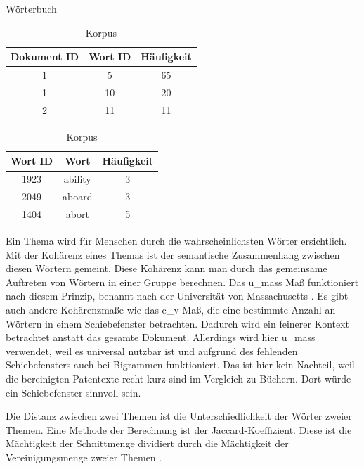 \begin{table}[!htb]
	\RawFloats
	\begin{minipage}{.5\linewidth}
		\caption{Wörterbuch}
		\centering
		\label{table:words}
		\begin{tabular}{|c|c|c|}
			\hline 
			Dokument ID & Wort ID & Häufigkeit \\ 
			\hline 
			1& 5 &65  \\ 
			\hline 
			1& 10 & 20 \\ 
			\hline 
			2& 11 & 11 \\ 
			\hline 
		\end{tabular} 
	\end{minipage}%
	\begin{minipage}{.5\linewidth}
		\centering
		\caption{Korpus}
		\label{table:corpus}
		\begin{tabular}{|c|c|c|}
			\hline 
			Wort ID & Wort & Häufigkeit \\ 
			\hline 
			1923& ability & 3 \\ 
			\hline 
			2049& aboard &3  \\ 
			\hline 
			1404& abort & 5 \\ 
			\hline 
		\end{tabular} 
	\end{minipage} 
\end{table}

Ein Thema wird für Menschen durch die wahrscheinlichsten Wörter ersichtlich. Mit der Kohärenz eines Themas ist der semantische Zusammenhang zwischen diesen Wörtern gemeint. Diese Kohärenz kann man durch das gemeinsame Auftreten von Wörtern in einer Gruppe berechnen. Das u\_mass Maß funktioniert nach diesem Prinzip, benannt nach der Universität von Massachusetts \parencite[vgl.][S. 265-266]{mimno2011optimizing}. Es gibt auch andere Kohärenzmaße wie das c\_v Maß, die eine bestimmte Anzahl an Wörtern in einem Schiebefenster betrachten. Dadurch wird ein feinerer Kontext betrachtet anstatt das gesamte Dokument. Allerdings wird hier u\_mass verwendet, weil es universal nutzbar ist und aufgrund des fehlenden Schiebefensters auch bei Bigrammen funktioniert. Das ist hier kein Nachteil, weil die bereinigten Patentexte recht kurz sind im Vergleich zu Büchern. Dort würde ein Schiebefenster sinnvoll sein.

Die Distanz zwischen zwei Themen ist die Unterschiedlichkeit der Wörter zweier Themen. Eine Methode der Berechnung ist der Jaccard-Koeffizient. Diese ist die Mächtigkeit der Schnittmenge dividiert durch die Mächtigkeit der Vereinigungsmenge zweier Themen \parencite[vgl.][S. 1]{kosub2019note}.


